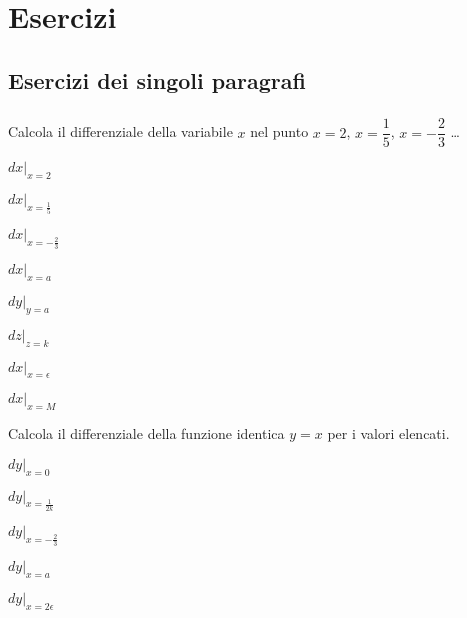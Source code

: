 
\section{Esercizi}

\subsection{Esercizi dei singoli paragrafi}

\subsubsection*{}
\begin{esercizio}
\label{ese:dif01}
 Calcola il differenziale della variabile $x$ nel punto $x=2$, 
$x=\dfrac{1}{5}$, $x=-\dfrac{2}{3}$ \dots
\begin{multicols}{2}
\begin{enumeratea}
  \item $dx|_{x=2}$
 \item $dx|_{x=\frac{1}{5}}$
 \item $dx|_{x=-\frac{2}{3}}$
 \item $dx|_{x=a}$ 
\item $dy|_{y=a}$
 \item $dz|_{z=k}$
 \item $dx|_{x=\epsilon}$
 \item $dx|_{x=M}$
\end{enumeratea}
\end{multicols}
\end{esercizio}

\begin{esercizio}
\label{ese:dif02}
 Calcola il differenziale della funzione identica $y=x$ per i valori elencati.
\begin{enumeratea}
 \item $dy|_{x=0}$
 \item $dy|_{x=\frac{1}{2k}}$
 \item $dy|_{x=-\frac{2}{3}}$
 \item $dy|_{x=a} $
 \item $dy|_{x=2\epsilon} $
 \end{enumeratea}
\end{esercizio}
 
